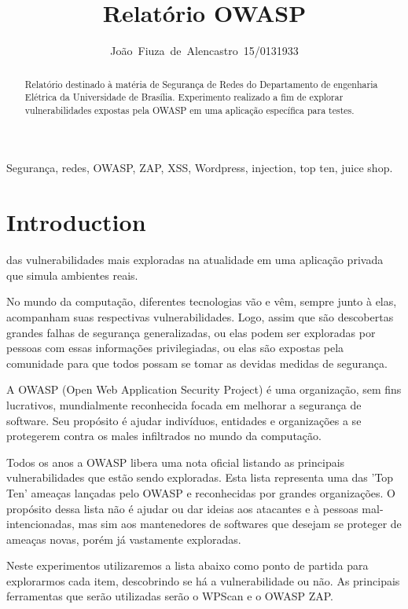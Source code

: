 \documentclass[journal]{IEEEtran}
\begin{document}
\title{Relatório OWASP}


\author{João~Fiuza~de~Alencastro~15/0131933}%




\maketitle


\begin{abstract}
Relatório destinado à matéria de Segurança de Redes do Departamento de engenharia Elétrica da Universidade de Brasília. Experimento realizado a fim de explorar vulnerabilidades expostas pela OWASP em uma aplicação específica para testes.
\end{abstract}

\begin{IEEEkeywords}
Segurança, redes, OWASP, ZAP, XSS, Wordpress, injection, top ten, juice shop.
\end{IEEEkeywords}


\IEEEpeerreviewmaketitle



\section{Introduction}
 das vulnerabilidades mais exploradas na atualidade em uma aplicação privada que simula ambientes reais. \par
No mundo da computação, diferentes tecnologias vão e vêm, sempre junto à elas, acompanham suas respectivas vulnerabilidades. Logo, assim que são descobertas grandes falhas de segurança generalizadas, ou elas podem ser exploradas por pessoas com essas informações privilegiadas, ou elas são expostas pela comunidade para que todos possam se tomar as devidas medidas de segurança. \par
A OWASP (Open Web Application Security Project) é uma organização, sem fins lucrativos, mundialmente reconhecida focada em melhorar a segurança de software. Seu propósito é ajudar indivíduos, entidades e organizações a se protegerem contra os males infiltrados no mundo da computação.\par
Todos os anos a OWASP libera uma nota oficial listando as principais vulnerabilidades que estão sendo exploradas. Esta lista representa uma das 'Top Ten' ameaças lançadas pelo OWASP e reconhecidas por grandes organizações. O propósito dessa lista não é ajudar ou dar ideias aos atacantes e à pessoas mal-intencionadas, mas sim aos mantenedores de softwares que desejam se proteger de ameaças novas, porém já vastamente exploradas. \par
Neste experimentos utilizaremos a lista abaixo como ponto de partida para explorarmos cada item, descobrindo se há a vulnerabilidade ou não. As principais ferramentas que serão utilizadas serão o WPScan e o OWASP ZAP. \\
\end{document}
